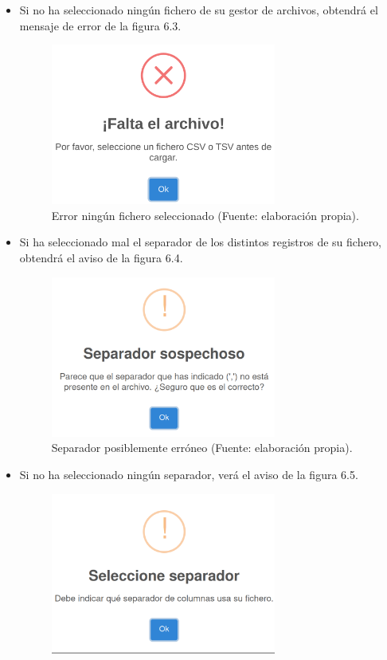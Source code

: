 \begin{itemize}
    \item Si no ha seleccionado ningún fichero de su gestor de archivos, obtendrá el mensaje de error de la figura 6.3.
    \begin{figure}[H]
        \centering
        \includegraphics[width=0.7\textwidth]{../img/err1.png}
        \caption{Error ningún fichero seleccionado (Fuente: elaboración propia).}
    \end{figure}
    \item Si ha seleccionado mal el separador de los distintos registros de su fichero, obtendrá el aviso de la figura 6.4.
    \begin{figure}[H]
        \centering
        \includegraphics[width=0.7\textwidth]{../img/sep.png}
        \caption{Separador posiblemente erróneo (Fuente: elaboración propia).}
    \end{figure}
    \item Si no ha seleccionado ningún separador, verá el aviso de la figura 6.5.
    \begin{figure}[H]
        \centering
        \includegraphics[width=0.7\textwidth]{../img/err2.png}

\end{figure}
\end{itemize}

